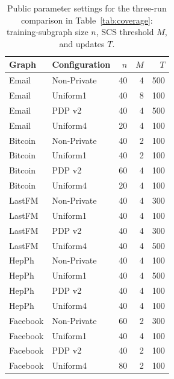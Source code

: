 \begin{table}[htbp]
\centering\small
\caption{Public parameter settings for the three-run comparison in Table~\ref{tab:coverage}: training-subgraph size $n$, SCS threshold $M$, and updates $T$.}\label{tab:frozenparams}
\begin{tabular}{llrrr}
\toprule
Graph & Configuration & $n$ & $M$ & $T$\\ \midrule
Email & Non-Private & 40 & 4 & 500 \\
Email & Uniform1 & 40 & 8 & 100 \\
Email & PDP v2 & 40 & 4 & 500 \\
Email & Uniform4 & 20 & 4 & 100 \\
Bitcoin & Non-Private & 40 & 2 & 100 \\
Bitcoin & Uniform1 & 40 & 2 & 100 \\
Bitcoin & PDP v2 & 60 & 4 & 100 \\
Bitcoin & Uniform4 & 20 & 4 & 100 \\
LastFM & Non-Private & 40 & 4 & 300 \\
LastFM & Uniform1 & 40 & 4 & 100 \\
LastFM & PDP v2 & 40 & 4 & 300 \\
LastFM & Uniform4 & 40 & 4 & 500 \\
HepPh & Non-Private & 40 & 4 & 100 \\
HepPh & Uniform1 & 40 & 4 & 500 \\
HepPh & PDP v2 & 40 & 4 & 100 \\
HepPh & Uniform4 & 40 & 4 & 100 \\
Facebook & Non-Private & 60 & 2 & 300 \\
Facebook & Uniform1 & 40 & 4 & 100 \\
Facebook & PDP v2 & 40 & 2 & 100 \\
Facebook & Uniform4 & 80 & 2 & 100 \\
\bottomrule\end{tabular}
\end{table}
